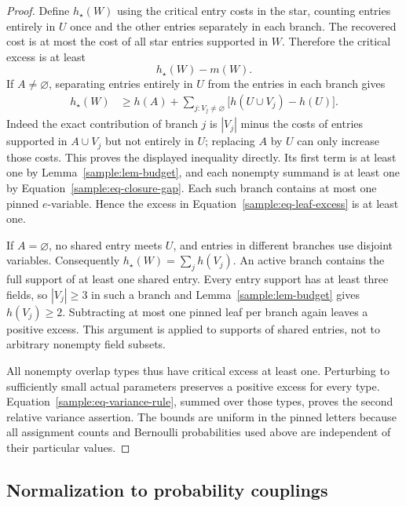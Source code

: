 \begin{proof}
Define $h_\star(W)$ using the critical entry costs in the star, counting
entries entirely in $U$ once and the other entries separately in each
branch.  The recovered cost is at most the cost of all star entries
supported in $W$.  Therefore the critical excess is at least
\begin{equation}\label{sample:eq-leaf-excess}
h_\star(W)-m(W).
\end{equation}
If $A\ne\varnothing$, separating entries entirely in $U$ from the
entries in each branch gives
\begin{align}
h_\star(W)
&\geq h(A)+
 \sum_{j:V_j\ne\varnothing}
       \bigl[h(U\cup V_j)-h(U)\bigr].
\label{sample:eq-star-submodular}
\end{align}
Indeed the exact contribution of branch $j$ is $|V_j|$ minus the
costs of entries supported in $A\cup V_j$ but not entirely in $U$;
replacing $A$ by $U$ can only increase those costs.  This proves the
displayed inequality directly.  Its first term is at least one by
Lemma~\ref{sample:lem-budget}, and each nonempty summand is at least
one by Equation~\eqref{sample:eq-closure-gap}.  Each such branch
contains at most one pinned $e$-variable.  Hence the excess in
Equation~\eqref{sample:eq-leaf-excess} is at least one.

If $A=\varnothing$, no shared entry meets $U$, and entries in different
branches use disjoint variables.  Consequently
$h_\star(W)=\sum_j h(V_j)$.  An active branch contains the full
support of at least one shared entry.  Every entry support has at least
three fields, so $|V_j|\geq3$ in such a branch and
Lemma~\ref{sample:lem-budget} gives $h(V_j)\geq2$.
Subtracting at most one pinned leaf per branch again leaves a positive
excess.  This argument is applied to supports of shared entries, not
to arbitrary nonempty field subsets.

All nonempty overlap types thus have critical excess at least one.
Perturbing to sufficiently small actual parameters preserves a positive
excess for every type.  Equation~\eqref{sample:eq-variance-rule}, summed
over those types, proves the second relative variance assertion.
The bounds are uniform in the pinned letters because all assignment
counts and Bernoulli probabilities used above are independent of their
particular values.
\end{proof}

\subsection{Normalization to probability couplings}

